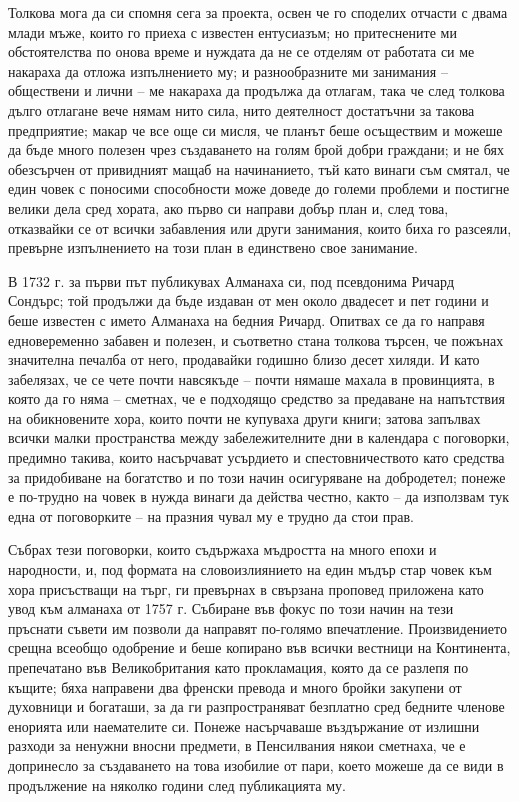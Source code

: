 \documentclass[12pt]{book}
\begin{document}
Толкова мога да си спомня сега за проекта, освен че го споделих отчасти с двама млади мъже, които го приеха с известен ентусиазъм; но притеснените ми обстоятелства по онова време и нуждата да не се отделям от работата си ме накараха да отложа изпълнението му; и разнообразните ми занимания – обществени и лични – ме накараха да продължа да отлагам, така че след толкова дълго отлагане вече нямам нито сила, нито деятелност достатъчни за такова предприятие; макар че все още си мисля, че планът беше осъществим и можеше да бъде много полезен чрез създаването на голям брой добри граждани; и не бях обезсърчен от привидният мащаб на начинанието, тъй като винаги съм смятал, че един човек с поносими способности може доведе до големи проблеми и постигне велики дела сред хората, ако първо си направи добър план и, след това, отказвайки се от всички забавления или други занимания, които биха го разсеяли, превърне изпълнението на този план в единствено свое занимание.

В 1732 г. за първи път публикувах Алманаха си, под псевдонима Ричард Сондърс; той продължи да бъде издаван от мен около двадесет и пет години и беше известен с името Алманаха на бедния Ричард. Опитвах се да го направя едновеременно забавен и полезен, и съответно стана толкова търсен, че пожънах значителна печалба от него, продавайки годишно близо десет хиляди. И като забелязах, че се чете почти навсякъде – почти нямаше махала в провинцията, в която да го няма – сметнах, че е подходящо средство за предаване на напътствия на обикновените хора, които почти не купуваха други книги; затова запълвах всички малки пространства между забележителните дни в календара с поговорки, предимно такива, които насърчават усърдието и спестовничеството като средства за придобиване на богатство и по този начин осигуряване на добродетел; понеже е по-трудно на човек в нужда винаги да действа честно, както – да използвам тук една от поговорките – на празния чувал му е трудно да стои прав.

Събрах тези поговорки, които съдържаха мъдростта на много епохи и народности, и, под формата на словоизлиянието на един мъдър стар човек към хора присъстващи на търг, ги превърнах в свързана проповед приложена като увод към алманаха от 1757 г. Събиране във фокус по този начин на тези пръснати съвети им позволи да направят по-голямо впечатление. Произвидението срещна всеобщо одобрение и беше копирано във всички вестници на Континента, препечатано във Великобритания като прокламация, която да се разлепя по къщите; бяха направени два френски превода и много бройки закупени от духовници и богаташи, за да ги разпространяват безплатно сред бедните членове енорията или наемателите си. Понеже насърчаваше въздържание от излишни разходи за ненужни вносни предмети, в Пенсилвания някои сметнаха, че е допринесло за създаването на това изобилие от пари, което можеше да се види в продължение на няколко години след публикацията му.
\end{document}
